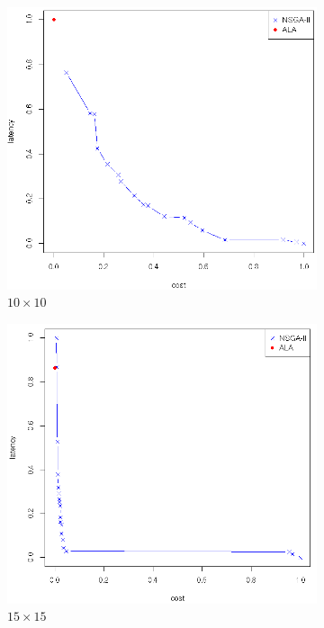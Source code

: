 \documentclass[twoside]{article}
\begin{document}
\begin{figure}[H]
	\begin{subfigure}[b]{0.4\textwidth}
		\includegraphics[width=\textwidth]{pics/111.png}
		\caption{$10 \times 10$}
		\label{fig:poor}
	\end{subfigure}
	\begin{subfigure}[b]{0.4\textwidth}
		\includegraphics[width=\textwidth]{pics/112.png}
		\caption{$15 \times 15$}
		\label{fig:minimum}
	\end{subfigure}

	\caption{}\label{fig:condition}
\end{figure}
\end{document}
